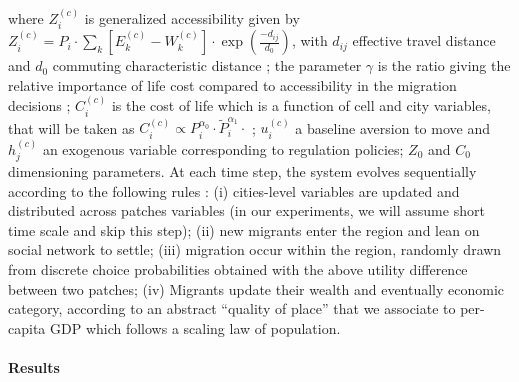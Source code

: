 where $Z_i^{(c)}$ is generalized accessibility given by $Z_i^{(c)} = P_i \cdot \sum_k \left[E_k^{(c)}-W_k^{(c)}\right]\cdot \exp{\left(\frac{-d_{ij}}{d_0}\right)}$, with $d_{ij}$ effective travel distance %
 and $d_0$ commuting characteristic distance ; the parameter $\gamma$ is the ratio giving the relative importance of life cost compared to accessibility in the migration decisions ; $C_i^{(c)}$ is the cost of life which is a function of cell and city variables, that will be taken as $C_i^{(c)} \propto P_i^{\alpha_0}\cdot  \tilde{P}_i^{\alpha_1}\cdot$ ; $u_i^{(c)}$ a baseline aversion to move and $h_j^{(c)}$ an exogenous variable corresponding to regulation policies; $Z_0$ and $C_0$ dimensioning parameters. At each time step, the system evolves sequentially according to the following rules : (i) cities-level variables are updated and distributed across patches variables (in our experiments, we will assume short time scale and skip this step); (ii) new migrants enter the region and lean on social network to settle; (iii) migration occur within the region, randomly drawn from discrete choice probabilities obtained with the above utility difference between two patches; (iv) Migrants update their wealth and eventually economic category, according to an abstract ``quality of place'' that we associate to per-capita GDP which follows a scaling law of population.



\paragraph{Results}

